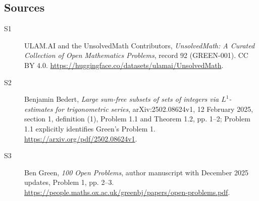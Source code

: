 \documentclass[11pt]{article}
\begin{document}
\subsection{Sources}
\begin{description}
\item[\hypertarget{source:92:1}{S1}] ULAM.AI and the UnsolvedMath Contributors, \emph{UnsolvedMath: A Curated Collection of Open Mathematics Problems}, record 92 (GREEN-001). CC BY 4.0. \url{https://huggingface.co/datasets/ulamai/UnsolvedMath}.
\item[\hypertarget{source:92:2}{S2}] Benjamin Bedert, \emph{Large sum-free subsets of sets of integers via $L^1$-estimates for trigonometric series}, arXiv:2502.08624v1, 12 February 2025, section 1, definition (1), Problem 1.1 and Theorem 1.2, pp. 1--2; Problem 1.1 explicitly identifies Green's Problem 1. \url{https://arxiv.org/pdf/2502.08624v1}.
\item[\hypertarget{source:92:3}{S3}] Ben Green, \emph{100 Open Problems}, author manuscript with December 2025 updates, Problem 1, pp. 2--3. \url{https://people.maths.ox.ac.uk/greenbj/papers/open-problems.pdf}.
\end{description}
\label{end:92}
\end{document}
